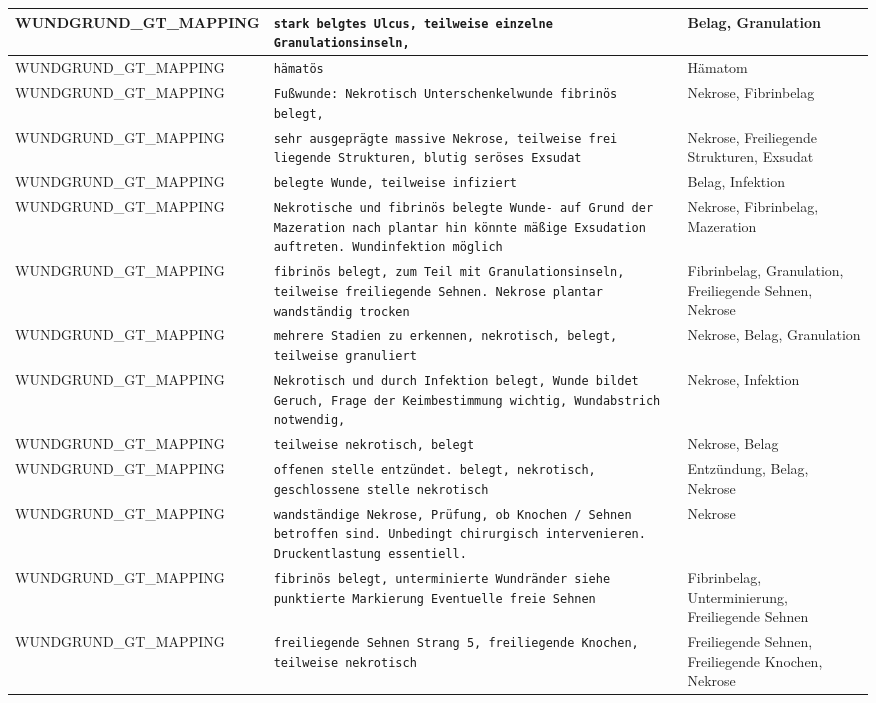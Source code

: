 \begin{longtable}{|p{3.5cm}|p{5cm}|p{6.5cm}|}
WUNDGRUND\_GT\_MAPPING & \texttt{stark belgtes Ulcus, teilweise einzelne Granulationsinseln,} & Belag, Granulation \\ \hline
WUNDGRUND\_GT\_MAPPING & \texttt{hämatös} & Hämatom \\ \hline
WUNDGRUND\_GT\_MAPPING & \texttt{Fußwunde: Nekrotisch  Unterschenkelwunde fibrinös belegt,} & Nekrose, Fibrinbelag \\ \hline
WUNDGRUND\_GT\_MAPPING & \texttt{sehr ausgeprägte massive Nekrose, teilweise frei liegende Strukturen, blutig seröses Exsudat} & Nekrose, Freiliegende Strukturen, Exsudat \\ \hline
WUNDGRUND\_GT\_MAPPING & \texttt{belegte Wunde, teilweise infiziert} & Belag, Infektion \\ \hline
WUNDGRUND\_GT\_MAPPING & \texttt{Nekrotische und fibrinös belegte Wunde- auf Grund der Mazeration nach plantar hin könnte mäßige Exsudation auftreten. Wundinfektion möglich} & Nekrose, Fibrinbelag, Mazeration \\ \hline
WUNDGRUND\_GT\_MAPPING & \texttt{fibrinös belegt, zum Teil mit Granulationsinseln, teilweise freiliegende Sehnen.
Nekrose plantar wandständig trocken} & Fibrinbelag, Granulation, Freiliegende Sehnen, Nekrose \\ \hline
WUNDGRUND\_GT\_MAPPING & \texttt{mehrere Stadien zu erkennen, nekrotisch, belegt, teilweise granuliert} & Nekrose, Belag, Granulation \\ \hline
WUNDGRUND\_GT\_MAPPING & \texttt{Nekrotisch und durch Infektion belegt, Wunde bildet Geruch, Frage der Keimbestimmung wichtig, Wundabstrich notwendig,} & Nekrose, Infektion \\ \hline
WUNDGRUND\_GT\_MAPPING & \texttt{teilweise nekrotisch, belegt} & Nekrose, Belag \\ \hline
WUNDGRUND\_GT\_MAPPING & \texttt{offenen stelle entzündet. belegt, nekrotisch, geschlossene stelle nekrotisch} & Entzündung, Belag, Nekrose \\ \hline
WUNDGRUND\_GT\_MAPPING & \texttt{wandständige Nekrose, Prüfung, ob Knochen / Sehnen betroffen sind. Unbedingt chirurgisch intervenieren.
Druckentlastung essentiell.} & Nekrose \\ \hline
WUNDGRUND\_GT\_MAPPING & \texttt{fibrinös belegt, unterminierte Wundränder siehe punktierte Markierung
Eventuelle freie Sehnen} & Fibrinbelag, Unterminierung, Freiliegende Sehnen \\ \hline
WUNDGRUND\_GT\_MAPPING & \texttt{freiliegende Sehnen Strang 5, freiliegende Knochen,
teilweise nekrotisch} & Freiliegende Sehnen, Freiliegende Knochen, Nekrose \\ \hline

\end{longtable}
